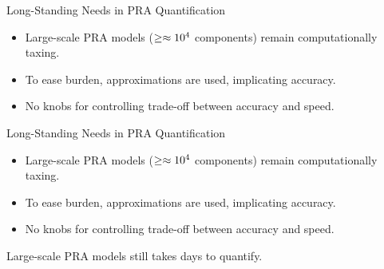 \begin{frame}[t]{Long-Standing Needs in PRA Quantification}
  \begin{itemize}
    \item Large-scale PRA models ($\geq\space\approx10^4$ components) remain computationally taxing.
    \item To ease burden, approximations are used, implicating accuracy.
    \item No knobs for controlling trade-off between accuracy and speed.
  \end{itemize}
\end{frame}

\begin{frame}[t]{Long-Standing Needs in PRA Quantification}
  \begin{itemize}
    \item Large-scale PRA models ($\geq\space\approx10^4$ components) remain computationally taxing.
    \item To ease burden, approximations are used, implicating accuracy.
    \item No knobs for controlling trade-off between accuracy and speed.
  \end{itemize}
    \vspace{16pt}
    Large-scale PRA models still takes days to quantify.
\end{frame}

